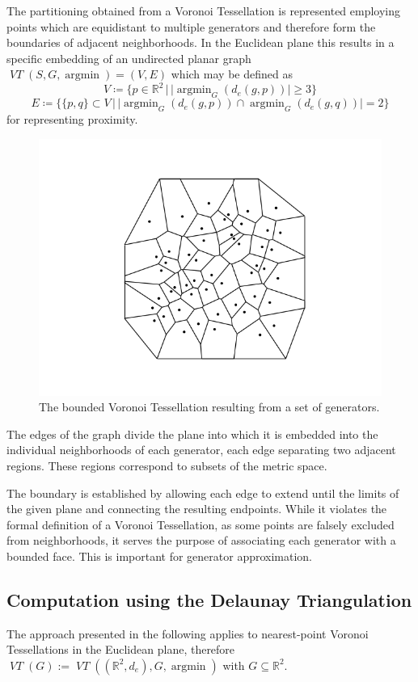 \documentclass[a4paper]{article}
\DeclareMathOperator*{\argmin}{argmin}
\DeclareMathOperator*{\VT}{\textit{VT}}
\begin{document}
The partitioning obtained from a Voronoi Tessellation is represented employing points which are equidistant to multiple
generators and therefore form the boundaries of adjacent neighborhoods. In the Euclidean plane this results in a specific
embedding of an undirected planar graph \(\VT(S, G, \argmin) = (V, E)\) which may be defined as
\[V \coloneqq \{p \in \mathbb{R}^2 \,|\, |\argmin_{G} (d_e(g, p))| \geq 3\}\]
\[E \coloneqq  \{\{p, q\} \subset V \,|\, |\argmin_{G} (d_e(g, p)) \cap \argmin_{G} (d_e(g, q))| = 2\}\]
for representing proximity.

\begin{figure}[H]
	\includegraphics[width=\textwidth]{voronoi_tessellation.png}
	\caption{The bounded Voronoi Tessellation resulting from a set of generators.}
\end{figure}

The edges of the graph divide the plane into which it is embedded into the individual neighborhoods of each generator,
each edge separating two adjacent regions. These regions correspond to subsets of the metric space.

The boundary is established by allowing each edge to extend until the limits of the given plane and connecting the
resulting endpoints. While it violates the formal definition of a Voronoi Tessellation, as some points are falsely
excluded from neighborhoods, it serves the purpose of associating each generator with a bounded face. This
is important for generator approximation.

\subsection{Computation using the Delaunay Triangulation}
The approach presented in the following applies to nearest-point Voronoi Tessellations in the Euclidean plane, therefore
\(\VT(G) := \VT((\mathbb{R}^2, d_e), G, \argmin)\) with \(G \subseteq \mathbb{R}^2\).
\end{document}
